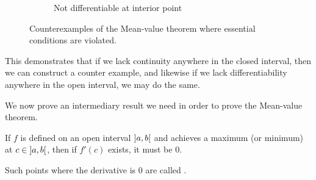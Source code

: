 \begin{figure}
\begin{subfigure}{0.3\textwidth}
		\centering
		\caption{Not differentiable at interior point}
	\end{subfigure}
	\caption{Counterexamples of the Mean-value theorem where essential conditions are violated.}
	\label{lec4:meanvalcounter}
\end{figure}


This demonstrates that if we lack continuity anywhere in the closed interval, then we can construct a counter example, and likewise if we lack differentiability anywhere in the open interval, we may do the same.

We now prove an intermediary result we need in order to prove the Mean-value theorem.

\begin{lemma}\label{lec4:criticalpoint}
	If $f$ is defined on an open interval $\interval[open]{a}{b}$ and achieves a maximum (or minimum) at $c \in \interval[open]{a}{b}$, then if $f'(c)$ exists, it must be $0$.
\end{lemma}

\noindent
Such points where the derivative is $0$ are called .

